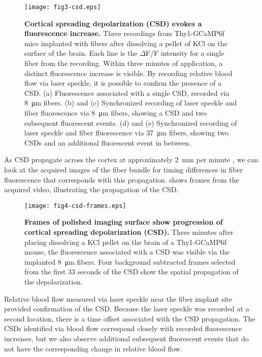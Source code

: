 \begin{figure}
\texttt{[image: fig3-csd.eps]}
\caption[Recording of fluorescence during CSD]{\textbf{Cortical spreading depolarization (CSD) evokes a fluorescence 
increase.} Three recordings from Thy1-GCaMP6f mice implanted with 
fibers after dissolving a pellet of KCl on the surface of the brain. 
Each line is the $\Delta$F/F intensity for a single fiber from the 
recording. Within three minutes of application, a distinct 
fluorescence increase is visible. By recording relative blood flow via
 laser speckle, it is possible to confirm the presence of a CSD. (a) 
Fluorescence associated with a single CSD, recorded via 
8~\si{\micro\meter} fibers. (b) and (c) Synchronized recording of 
laser speckle and fiber fluorescence via 8~\si{\micro\meter} fibers, 
showing a CSD and two subsequent fluorescent events. (d) and (e) 
Synchronized recording of laser speckle and fiber fluorescence via 
37~\si{\micro\meter} fibers, showing two CSDs and an additional 
fluorescent event in between.}
\label{fig:csd}
\end{figure}

As CSD propagate across the cortex at approximately 
2~\si{\milli\meter} per minute \cite{Ochs:1960jx,Pietrobon:2014gn}, we
 can look at the acquired images of the fiber bundle for timing 
differences in fiber fluorescence that corresponds with this 
propagation.  shows frames from the acquired video, 
illustrating the propagation of the CSD.

\begin{figure}
\texttt{[image: fig4-csd-frames.eps]}
\caption[Images of fiber bundle during CSD]{\textbf{Frames of polished imaging surface show progression of cortical 
spreading depolarization (CSD).} Three minutes after placing dissolving
 a KCl pellet on the brain of a Thy1-GCaMP6f mouse, the fluorescence 
associated with a CSD was visible via the implanted 
8~\si{\micro\meter} fibers. Four background subtracted frames selected
 from the first 33 seconds of the CSD show the spatial propagation of 
the depolarization.}
\label{fig:csd-frames}
\end{figure}

Relative blood flow measured via laser speckle near the fiber implant 
site provided confirmation of the CSD. Because the laser speckle was 
recorded at a second location, there is a time offset associated with 
the CSD propagation. The CSDs identified via blood flow correspond 
closely with recorded fluorescence increases, but we also observe 
additional subsequent fluorescent events that do not have the 
corresponding change in relative blood flow.

